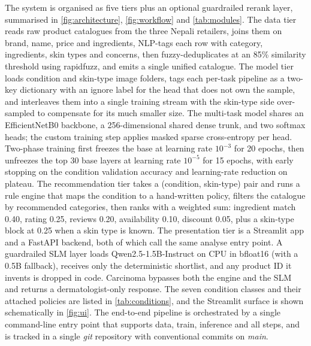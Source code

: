 \documentclass[11pt,a4paper]{article}
\begin{document}
The system is organised as five tiers plus an optional guardrailed
rerank layer, summarised in \autoref{fig:architecture},
\autoref{fig:workflow} and \autoref{tab:modules}. The data tier reads
raw product catalogues from
the three Nepali retailers, joins them on brand, name, price and
ingredients, NLP-tags each row with category, ingredients, skin types
and concerns, then fuzzy-deduplicates at an 85\% similarity threshold
using rapidfuzz, and emits a single unified catalogue. The model tier
loads condition and skin-type image folders, tags each per-task
pipeline as a two-key dictionary with an ignore label for the head
that does not own the sample, and interleaves them into a single
training stream with the skin-type side over-sampled to compensate for
its much smaller size. The multi-task model shares an EfficientNetB0
backbone, a 256-dimensional shared dense trunk, and two softmax heads;
the custom training step applies masked sparse cross-entropy per head.
Two-phase training first freezes the base at learning rate \(10^{-3}\)
for 20 epochs, then unfreezes the top 30 base layers at learning rate
\(10^{-5}\) for 15 epochs, with early stopping on the condition
validation accuracy and learning-rate reduction on plateau. The
recommendation tier takes a (condition, skin-type) pair and runs a
rule engine that maps the condition to a hand-written policy,
filters the catalogue by recommended categories, then ranks with a
weighted sum: ingredient match 0.40, rating 0.25, reviews 0.20,
availability 0.10, discount 0.05, plus a skin-type block at 0.25
when a skin type is known. The presentation tier is a Streamlit app
and a FastAPI backend, both of which call the same analyse entry
point. A guardrailed SLM layer loads Qwen2.5-1.5B-Instruct on CPU in
bfloat16 (with a 0.5B fallback), receives only the deterministic
shortlist, and any product ID it invents is dropped in code. Carcinoma
bypasses both the engine and the SLM and returns a dermatologist-only
response. The seven condition classes and their attached policies are
listed in \autoref{tab:conditions}, and the Streamlit surface is shown
schematically in \autoref{fig:ui}. The end-to-end pipeline is
orchestrated by a single command-line entry point that supports
data, train, inference and all steps, and is tracked in a single
\emph{git} repository with conventional commits on \emph{main}.
\end{document}
